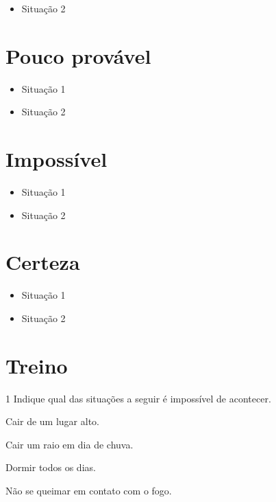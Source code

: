 \begin{itemize}
\item Situação 2
\end{itemize}

\section*{Pouco provável}

\begin{itemize}
\item Situação 1
\end{itemize}

\begin{itemize}
\item Situação 2
\end{itemize}

\section*{Impossível}

\begin{itemize}
\item Situação 1
\end{itemize}

\begin{itemize}
\item Situação 2
\end{itemize}

\section*{Certeza}

\begin{itemize}
\item Situação 1
\end{itemize}

\begin{itemize}
\item Situação 2
\end{itemize}

\section*{Treino}

\num{1} Indique qual das situações a seguir é impossível de acontecer.

\begin{escolha}[itemsep=-5pt]
\item Cair de um lugar alto.

\item Cair um raio em dia de chuva.

\item Dormir todos os dias.

\item Não se queimar em contato com o fogo.
\end{escolha}

